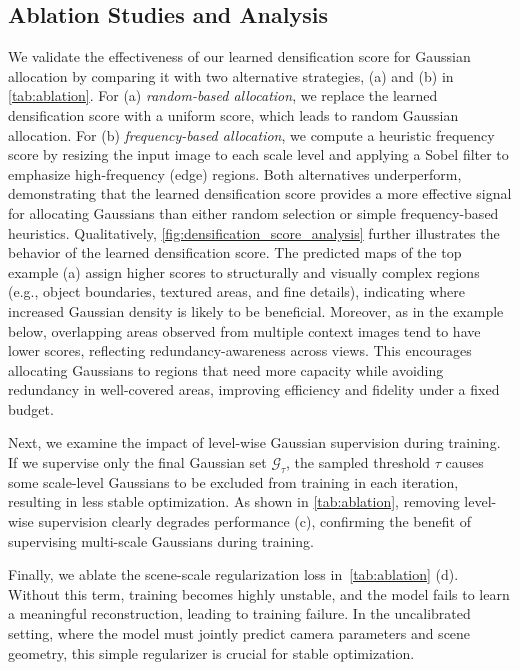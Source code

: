 \subsection{Ablation Studies and Analysis}
\vspace{-3pt}
We validate the effectiveness of our learned densification score for Gaussian allocation by comparing it with two alternative strategies, (a) and (b) in \cref{tab:ablation}.
For (a) \textit{random-based allocation}, we replace the learned densification score with a uniform score, which leads to random Gaussian allocation.
For (b) \textit{frequency-based allocation}, we compute a heuristic frequency score by resizing the input image to each scale level and applying a Sobel filter to emphasize high-frequency (edge) regions.
Both alternatives underperform, demonstrating that the learned densification score provides a more effective signal for allocating Gaussians than either random selection or simple frequency-based heuristics. 
Qualitatively, \cref{fig:densification_score_analysis} further illustrates the behavior of the learned densification score.
The predicted maps of the top example (a) assign higher scores to structurally and visually complex regions (e.g., object boundaries, textured areas, and fine details), indicating where increased Gaussian density is likely to be beneficial.
Moreover, as in the example below, overlapping areas observed from multiple context images tend to have lower scores, reflecting redundancy-awareness across views.
This encourages allocating Gaussians to regions that need more capacity while avoiding redundancy in well-covered areas, improving efficiency and fidelity under a fixed budget.

Next, we examine the impact of level-wise Gaussian supervision during training. If we supervise only the final Gaussian set $\mathcal{G}_\tau$, the sampled threshold $\tau$ causes some scale-level Gaussians to be excluded from training in each iteration, resulting in less stable optimization. As shown in \cref{tab:ablation}, removing level-wise supervision clearly degrades performance (c), confirming the benefit of supervising multi-scale Gaussians during training.

Finally, we ablate the scene-scale regularization loss in~\cref{tab:ablation} (d). Without this term, training becomes highly unstable, and the model fails to learn a meaningful reconstruction, leading to training failure. In the uncalibrated setting, where the model must jointly predict camera parameters and scene geometry, this simple regularizer is crucial for stable optimization.
